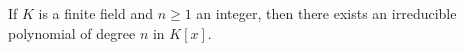 If $K$ is a finite field and $n \geq 1$ an integer, then there exists an irreducible polynomial of degree $n$ in $K[x]$.
